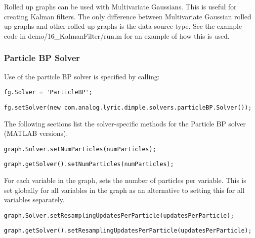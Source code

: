 \fi



Rolled up graphs can be used with Multivariate Gaussians.  This is useful for creating Kalman filters.  The only difference between Multivariate Gaussian rolled up graphs and other rolled up graphs is the data source type.  See the example code in demo/16\_KalmanFilter/run.m for an example of how this is used.


\subsubsection{Particle BP Solver}

Use of the particle BP solver is specified by calling:

\ifmatlab
\begin{lstlisting}
fg.Solver = 'ParticleBP';
\end{lstlisting}
\fi

\ifjava
\begin{lstlisting}
fg.setSolver(new com.analog.lyric.dimple.solvers.particleBP.Solver());
\end{lstlisting}
\fi


The following sections list the solver-specific methods for the Particle BP solver (MATLAB versions).


\ifmatlab
\begin{lstlisting}
graph.Solver.setNumParticles(numParticles);
\end{lstlisting}
\fi

\ifjava
\begin{lstlisting}
graph.getSolver().setNumParticles(numParticles);
\end{lstlisting}
\fi

For each variable in the graph, sets the number of particles per variable. This is set globally for all variables in the graph as an alternative to setting this for all variables separately.

\ifmatlab
\begin{lstlisting}
graph.Solver.setResamplingUpdatesPerParticle(updatesPerParticle);
\end{lstlisting}
\fi

\ifjava
\begin{lstlisting}
graph.getSolver().setResamplingUpdatesPerParticle(updatesPerParticle);
\end{lstlisting}
\fi

